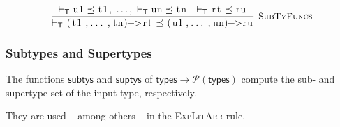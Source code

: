 \documentclass{article}
\newcommand{\code}[1]{\lstinline[columns=fixed]{#1}}
\newcommand{\drmrule}[5]{\frac{#1}{#2\vdash_{\mathsf{#3}}#4}\textsc{\ \small{#5}}}
\newcommand{\ruleapp}[1]{\vdash_{\mathsf{#1}}}
\newcommand{\mc}[1]{\textnormal{\code{#1}}}
\begin{document}
				\begin{align*}
					\drmrule{\ruleapp{T}\mc{u1}\preceq\mc{t1},\ \dots,\ \ruleapp{T}\mc{un}\preceq\mc{tn}\ \ \ruleapp{T}\mc{rt}\preceq\mc{ru}}{}{T}{\mc{(t1,...,tn)->rt} \preceq \mc{(u1,...,un)->ru}}{SubTyFuncs}
				\end{align*}
				
			\subsubsection{Subtypes and Supertypes}
			
				The functions $\mathsf{subtys}$ and $\mathsf{suptys}$ of $\mathsf{types}\to\mathcal{P}(\mathsf{types})$ compute the sub- and supertype set of the input type, respectively.
				
				They are used -- among others -- in the \textsc{ExpLitArr} rule.
				
\end{document}
